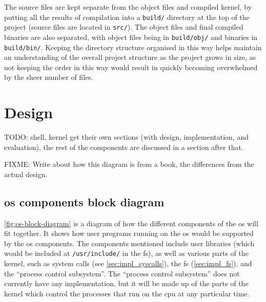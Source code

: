 \documentclass{article}
\begin{document}
The source files are kept separate from the object files and compiled kernel,
by putting all the results of compilation into a \texttt{build/} directory at
the top of the project (source files are located in \texttt{src/}). The object
files and final compiled binaries are also separated, with object files being
in \texttt{build/obj/} and binaries in \texttt{build/bin/}. Keeping the
directory structure organised in this way helps maintain an understanding of
the overall project structure as the project grows in size, as not keeping the
order in this way would result in quickly becoming overwhelmed by the sheer
number of files.

\section{Design}
TODO: shell, kernel get their own sections (with design, implementation, and
evaluation), the rest of the components are discussed in a section after that.

FIXME: Write about how this diagram is from a book, the differences from the
actual design.

\subsection{\texorpdfstring{\gls{os}}{OS} components block diagram}
\autoref{fig:os-block-diagram} is a diagram of how the different components of
the \gls{os} will fit together. It shows how user programs running on the
\gls{os} would be supported by the \gls{os} components. The components
mentioned include user libraries (which would be included at
\texttt{/usr/include/} in the \gls{fs}), as well as various parts of the
kernel, such as system calls (see \autoref{sec:impl_syscalls}), the \gls{fs}
(\autoref{sec:impl_fs}), and the ``process control subsystem''. The ``process
control subsystem'' does not currently have any implementation, but it will be
made up of the parts of the kernel which control the processes that run on the
\gls{cpu} at any particular time.
\end{document}
